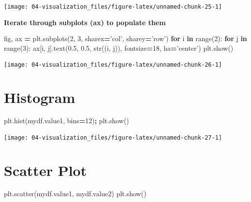 \documentclass[
]{book}
\newenvironment{Shaded}{\begin{snugshade}}{\end{snugshade}}
\newcommand{\BuiltInTok}[1]{#1}
\newcommand{\ControlFlowTok}[1]{\textcolor[rgb]{0.27,0.27,0.27}{\textbf{#1}}}
\newcommand{\DecValTok}[1]{\textcolor[rgb]{0.06,0.06,0.06}{#1}}
\newcommand{\FloatTok}[1]{\textcolor[rgb]{0.06,0.06,0.06}{#1}}
\newcommand{\KeywordTok}[1]{\textcolor[rgb]{0.27,0.27,0.27}{\textbf{#1}}}
\newcommand{\NormalTok}[1]{#1}
\newcommand{\OperatorTok}[1]{\textcolor[rgb]{0.43,0.43,0.43}{\textbf{#1}}}
\newcommand{\StringTok}[1]{\textcolor[rgb]{0.5,0.5,0.5}{#1}}
\begin{document}
\texttt{[image: 04-visualization\_files/figure-latex/unnamed-chunk-25-1]}

\textbf{Iterate through subplots (ax) to populate them}

\begin{Shaded}
\begin{Highlighting}[]
\NormalTok{fig, ax }\OperatorTok{=}\NormalTok{ plt.subplots(}\DecValTok{2}\NormalTok{, }\DecValTok{3}\NormalTok{, sharex}\OperatorTok{=}\StringTok{'col'}\NormalTok{, sharey}\OperatorTok{=}\StringTok{'row'}\NormalTok{)}
\ControlFlowTok{for}\NormalTok{ i }\KeywordTok{in} \BuiltInTok{range}\NormalTok{(}\DecValTok{2}\NormalTok{):}
    \ControlFlowTok{for}\NormalTok{ j }\KeywordTok{in} \BuiltInTok{range}\NormalTok{(}\DecValTok{3}\NormalTok{):}
\NormalTok{        ax[i, j].text(}\FloatTok{0.5}\NormalTok{, }\FloatTok{0.5}\NormalTok{, }\BuiltInTok{str}\NormalTok{((i, j)),}
\NormalTok{                      fontsize}\OperatorTok{=}\DecValTok{18}\NormalTok{, ha}\OperatorTok{=}\StringTok{'center'}\NormalTok{)}
\NormalTok{plt.show()}
\end{Highlighting}
\end{Shaded}

\texttt{[image: 04-visualization\_files/figure-latex/unnamed-chunk-26-1]}

\hypertarget{histogram}{%
\section{Histogram}\label{histogram}}

\begin{Shaded}
\begin{Highlighting}[]
\NormalTok{plt.hist(mydf.value1, bins}\OperatorTok{=}\DecValTok{12}\NormalTok{)}\OperatorTok{;}
\NormalTok{plt.show()}
\end{Highlighting}
\end{Shaded}

\texttt{[image: 04-visualization\_files/figure-latex/unnamed-chunk-27-1]}

\hypertarget{scatter-plot}{%
\section{Scatter Plot}\label{scatter-plot}}

\begin{Shaded}
\begin{Highlighting}[]
\NormalTok{plt.scatter(mydf.value1, mydf.value2)}
\NormalTok{plt.show()}
\end{Highlighting}
\end{Shaded}
\end{document}
